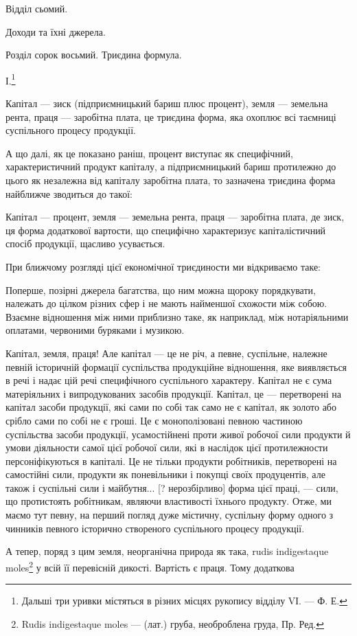 Відділ сьомий.

Доходи та їхні джерела.

Розділ сорок восьмий.
Триєдина формула.

І.\footnote{
Дальші три уривки містяться в різних місцях рукопису відділу VІ. — Ф. Е.
}

Капітал — зиск (підприємницький бариш плюс процент), земля — земельна
рента, праця — заробітна плата, це триєдина форма, яка охоплює всі таємниці
суспільного процесу продукції.

А що далі, як це показано раніш, процент виступає як специфічний,
характеристичний продукт капіталу, а підприємницький бариш протилежно
до цього як незалежна від капіталу заробітна плата, то зазначена триєдина
форма найближче зводиться до такої:

Капітал — процент, земля — земельна рента, праця — заробітна плата, де зиск,
ця форма додаткової вартости, що специфічно характеризує капіталістичний спосіб
продукції, щасливо усувається.

При ближчому розгляді цієї економічної триєдиности ми відкриваємо таке:

Поперше, позірні джерела багатства, що ним можна щороку порядкувати,
належать до цілком різних сфер і не мають найменшої схожости між собою.
Взаємне відношення між ними приблизно таке, як наприклад, між нотаріяльними
оплатами, червоними буряками і музикою.

Капітал, земля, праця! Але капітал — це не річ, а певне, суспільне,
належне певній історичній формації суспільства продукційне відношення, яке
виявляється в речі і надає цій речі специфічного суспільного характеру. Капітал
не є сума матеріяльних і випродукованих засобів продукції. Капітал, це —
перетворені на капітал засоби продукції, які сами по собі так само не є капітал,
як золото або срібло сами по собі не є гроші. Це є монополізовані певною
частиною суспільства засоби продукції, усамостійнені проти живої робочої сили
продукти й умови діяльности самої цієї робочої сили, які в наслідок цієї протилежности
персоніфікуються в капіталі. Це не тільки продукти робітників,
перетворені на самостійні сили, продукти як поневільники і покупці своїх продуцентів,
але також і суспільні сили і майбутня... [? нерозбірливо] форма цієї
праці, — сили, що протистоять робітникам, являючи властивості їхнього продукту.
Отже, ми маємо тут певну, на перший погляд дуже містичну, суспільну форму
одного з чинників певного історично створеного суспільного процесу продукції.

А тепер, поряд з цим земля, неорганічна природа як така, rudis indigestaque
moles\footnote*{
Rudis indigestaque moles — (лат.) груба, необроблена груда, Пр. Ред.
} у всій її перевісній дикості. Вартість є праця. Тому додаткова
\parbreak{}  %
